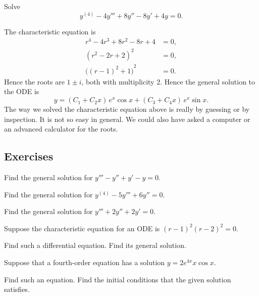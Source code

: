 \begin{example}
Solve
\begin{equation*}
y^{(4)} - 4 y''' + 8 y'' - 8 y' + 4y = 0 .
\end{equation*}

The characteristic equation is
\begin{align*}
r^4 - 4 r^3 + 8 r^2 - 8 r + 4 & = 0 , \\
{(r^2-2r+2)}^2 & = 0 , \\
{\bigl({(r-1)}^2+1\bigr)}^2 & = 0 .
\end{align*}
Hence the roots are $1 \pm i$, both with multiplicity 2.  Hence the general
solution to the ODE is
\begin{equation*}
y = 
( C_1 + C_2 x ) \, e^{x} \cos x
+
( C_3 + C_4 x ) \, e^{x} \sin x .
\end{equation*}
The way we solved the characteristic equation above is really by guessing or
by inspection.  It is not so easy in general.  We could also have asked
a computer or an advanced calculator for the roots.
\end{example}


\subsection{Exercises}

\begin{exercise}
Find the general solution for $y''' - y'' + y' - y = 0$.
\end{exercise}

\begin{exercise}
Find the general solution for $y^{(4)} - 5 y''' + 6 y'' = 0$.
\end{exercise}

\begin{exercise}
Find the general solution for $y''' + 2 y'' + 2 y' = 0$.
\end{exercise}

\begin{exercise}
Suppose the characteristic equation for an ODE is
${(r-1)}^2{(r-2)}^2 = 0$.
\begin{tasks}
\task
Find such a differential equation.
\task
Find its general solution.
\end{tasks}
\end{exercise}

\begin{exercise} \label{hol:eqfromsolex}
Suppose that a fourth-order equation has a solution
$y = 2 e^{4x} x \cos x$.  
\begin{tasks}
\task
Find such an equation.
\task
Find the initial conditions that the given
solution satisfies.
\end{tasks}
\end{exercise}

